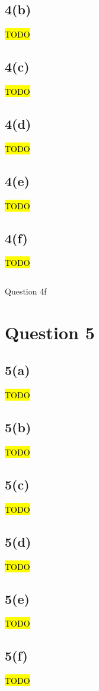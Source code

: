 \documentclass[12pt, a4paper,reqno]{article}
\begin{document}
\subsection*{4(b)}
\hl{TODO}

\subsection*{4(c)}
\hl{TODO}

\subsection*{4(d)}
\hl{TODO}

\subsection*{4(e)}
\hl{TODO}

\subsection*{4(f)}
\hl{TODO}

\begin{listing}
\inputminted[linenos]{python}{question_4f.py}
\caption{Question 4f}
\end{listing}



%
%
\clearpage\section*{Question 5}

\subsection*{5(a)}
\hl{TODO}

\subsection*{5(b)}
\hl{TODO}

\subsection*{5(c)}
\hl{TODO}

\subsection*{5(d)}
\hl{TODO}

\subsection*{5(e)}
\hl{TODO}

\subsection*{5(f)}
\hl{TODO}
\end{document}
